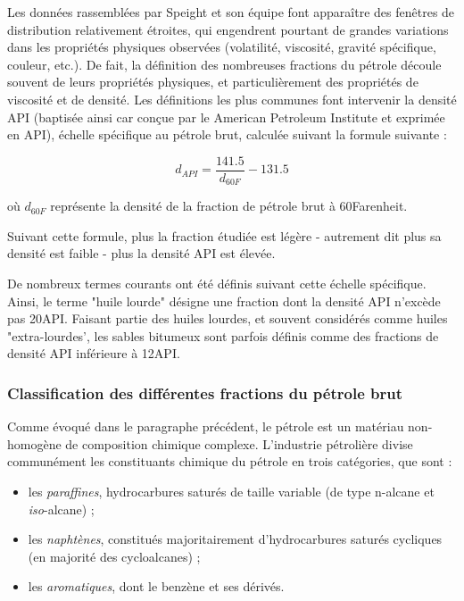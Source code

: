 Les données rassemblées par Speight et son équipe font apparaître des fenêtres de distribution relativement étroites, qui engendrent pourtant de grandes variations dans les propriétés physiques observées (volatilité, viscosité, gravité spécifique, couleur, etc.). De fait, la définition des nombreuses fractions du pétrole découle souvent de leurs propriétés physiques, et particulièrement des propriétés de viscosité et de densité. Les définitions les plus communes font intervenir la densité API (baptisée ainsi car conçue par le \og American Petroleum Institute \fg{} et exprimée en \degre API), échelle spécifique au pétrole brut, calculée suivant la formule suivante : 

\begin{equation}
d_{API}=\dfrac{141.5}{d_{60F}}-131.5
\end{equation}

où $d_{60F}$ représente la densité de la fraction de pétrole brut à 60\degre Farenheit. 

Suivant cette formule, plus la fraction étudiée est légère - autrement dit plus sa densité est faible - plus la densité API est élevée. 

De nombreux termes courants ont été définis suivant cette échelle spécifique. Ainsi, le terme "huile lourde" désigne une fraction dont la densité API n'excède pas 20\degre API. Faisant partie des huiles lourdes, et souvent considérés comme huiles "extra-lourdes', les sables bitumeux sont parfois définis comme des fractions de densité API inférieure à 12\degre API. 

\subsubsection{Classification des différentes fractions du pétrole brut}

Comme évoqué dans le paragraphe précédent, le pétrole est un matériau non-homogène de composition chimique complexe. L'industrie pétrolière divise communément les constituants chimique du pétrole en trois catégories, que sont : 

\begin{itemize}
	\item les \textit{paraffines}, hydrocarbures saturés de taille variable (de type n-alcane et \textit{iso}-alcane) ;
	\item les \textit{naphtènes}, constitués majoritairement d'hydrocarbures saturés cycliques (en majorité des cycloalcanes) ;
	\item les \textit{aromatiques}, dont le benzène et ses dérivés.
\end{itemize} 

